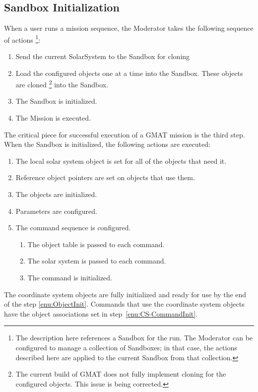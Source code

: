 \subsection{Sandbox Initialization}

When a user runs a mission sequence, the Moderator takes the following sequence of actions
\footnote{The description here references a Sandbox for the run. The Moderator can be configured to
manage a collection of Sandboxes; in that case, the actions described here are applied to the
current Sandbox from that collection.}:

\begin{enumerate}
\item Send the current SolarSystem to the Sandbox for cloning
\item Load the configured objects one at a time into the Sandbox. These objects are cloned
\footnote{The current build of GMAT does not fully implement cloning for the configured objects.
This issue is being corrected.} into the Sandbox.
\item The Sandbox is initialized.
\item The Mission is executed.
\end{enumerate}

\noindent The critical piece for successful execution of a GMAT mission is the third step. When the
Sandbox is initialized, the following actions are executed:

\begin{enumerate}
\item The local solar system object is set for all of the objects that need it.
\item Reference object pointers are set on objects that use them.
\item \label{enu:ObjectInit}The objects are initialized.
\item Parameters are configured.
\item The command sequence is configured.
\begin{enumerate}
\item The object table is passed to each command.
\item The solar system is passed to each command.
\item \label{enu:CS-CommandInit}The command is initialized.
\end{enumerate}
\end{enumerate}

\noindent The coordinate system objects are fully initialized and ready for use by the end of the
step \ref{enu:ObjectInit}. Commands that use the coordinate system objects have the object
associations set in step~\ref{enu:CS-CommandInit}.

